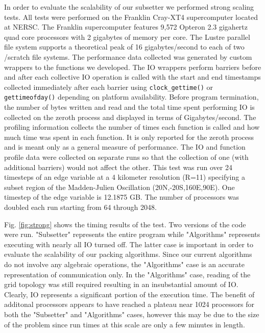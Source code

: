 In order to evaluate the scalability of our subsetter we performed strong
scaling tests.  All tests were performed on the Franklin Cray-XT4
supercomputer\cite{franklin} located at NERSC\cite{NERSC}.  The Franklin
supercomputer features 9,572 Opteron 2.3 gigahertz quad core processors with 2
gigabytes of memory per core.  The Lustre parallel file system supports a
theoretical peak of 16 gigabytes/second to each of two /scratch file systems.
The performance data collected was generated by custom wrappers to the
functions we developed.  The IO wrappers perform barriers before and after
each collective IO operation is called with the start and end timestamps
collected immediately after each barrier using \verb=clock_gettime()= or
\verb=gettimeofday()= depending on platform availability.  Before program
termination, the number of bytes written and read and the total time spent
performing IO is collected on the zeroth process and displayed in terms of
Gigabytes/second.  The profiling information collects the number of times each
function is called and how much time was spent in each function.  It is only
reported for the zeroth process and is meant only as a general measure of
performance.  The IO and function profile data were collected on separate runs
so that the collection of one (with additional barriers) would not affect the
other.  This test was run over 24 timesteps of an edge variable at a 4
kilometer resolution (R=11) specifying a subset region of the Madden-Julien
Oscillation\cite{MJO} (20N,-20S,160E,90E).  One timestep of the edge variable
is 12.1875 GB.  The number of processors was doubled each run starting from 64
through 2048.

Fig. \ref{fig:strong} shows the timing results of the test.  Two versions of
the code were run.  "Subsetter" represents the entire program while
"Algorithms" represents executing with nearly all IO turned off.  The latter
case is important in order to evaluate the scalability of our packing
algorithms.  Since our current algorithms do not involve any algebraic
operations, the "Algorithms" case is an accurate representation of
communication only.  In the "Algorithms" case, reading of the grid topology was
still required resulting in an insubstantial amount of IO.  Clearly, IO
represents a significant portion of the execution time.  The benefit of
additonal processors appears to have reached a plateau near 1024 processors for
both the "Subsetter" and "Algorithms" cases, however this may be due to the
size of the problem since run times at this scale are only a few minutes in
length.


